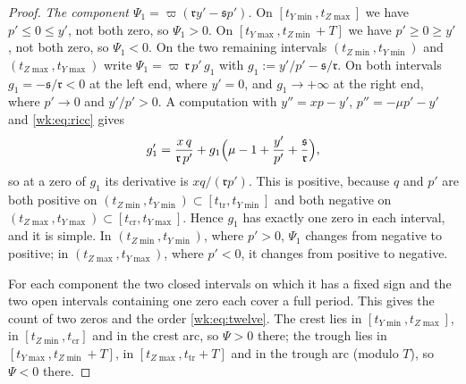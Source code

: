 \begin{proof}
\emph{The component $\Psi_1=\varpi(\mathfrak ry'-\mathfrak sp')$.} On $[t_{Y\min},t_{Z\max}]$ we have $p'\le0\le y'$, not both zero, so $\Psi_1>0$. On $[t_{Y\max},t_{Z\min}+T]$ we have $p'\ge0\ge y'$, not both zero, so $\Psi_1<0$. On the two remaining intervals $(t_{Z\min},t_{Y\min})$ and $(t_{Z\max},t_{Y\max})$ write $\Psi_1=\varpi\,\mathfrak r\,p'\,g_1$ with $g_1:=y'/p'-\mathfrak s/\mathfrak r$. On both intervals $g_1=-\mathfrak s/\mathfrak r<0$ at the left end, where $y'=0$, and $g_1\to+\infty$ at the right end, where $p'\to0$ and $y'/p'>0$. A computation with $y''=xp-y'$, $p''=-\mu p'-y'$ and \eqref{wk:eq:ricc} gives
\[
g_1'=\frac{x\,q}{\mathfrak r\,p'}+g_1\Bigl(\mu-1+\frac{y'}{p'}+\frac{\mathfrak s}{\mathfrak r}\Bigr),
\]
so at a zero of $g_1$ its derivative is $xq/(\mathfrak rp')$. This is positive, because $q$ and $p'$ are both positive on $(t_{Z\min},t_{Y\min})\subset[t_{\mathrm{tr}},t_{Y\min}]$ and both negative on $(t_{Z\max},t_{Y\max})\subset[t_{\mathrm{cr}},t_{Y\max}]$. Hence $g_1$ has exactly one zero in each interval, and it is simple. In $(t_{Z\min},t_{Y\min})$, where $p'>0$, $\Psi_1$ changes from negative to positive; in $(t_{Z\max},t_{Y\max})$, where $p'<0$, it changes from positive to negative.

For each component the two closed intervals on which it has a fixed sign and the two open intervals containing one zero each cover a full period. This gives the count of two zeros and the order \eqref{wk:eq:twelve}. The crest lies in $[t_{Y\min},t_{Z\max}]$, in $[t_{Z\min},t_{\mathrm{cr}}]$ and in the crest arc, so $\Psi>0$ there; the trough lies in $[t_{Y\max},t_{Z\min}+T]$, in $[t_{Z\max},t_{\mathrm{tr}}+T]$ and in the trough arc (modulo $T$), so $\Psi<0$ there.
\end{proof}

